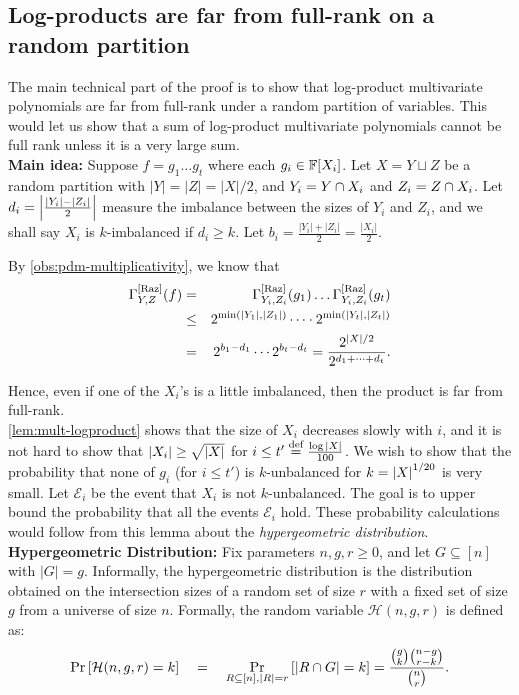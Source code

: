 \subsection{Log-products are far from full-rank on a random
  partition}

The main technical part of the proof is to show that log-product multivariate polynomials are far from full-rank under a random partition of variables. 
This would let us show that a sum of log-product multivariate polynomials cannot be full rank unless it is a very large sum.\\

{\bf Main idea: } Suppose $f = g_1 \dots g_t$ where each $g_i \in \mathbb{F}[X_i]$. 
Let $X = Y \sqcup Z$ be a random partition with $|Y| = |Z| = |X|/2$, and $Y_i = Y \cap X_i$ and $Z_i = Z \cap X_i$. 
Let $d_i = \left|\frac{|Y_i| - |Z_i|}{2}\right|$ measure the imbalance between the sizes of $Y_i$ and $Z_i$, and we shall say $X_i$ is $k$-imbalanced if $d_i \geq k$. 
Let $b_i = \frac{|Y_i| + |Z_i|}{2} = \frac{|X_i|}{2}$.

By \autoref{obs:pdm-multiplicativity}, we know that 
\begin{eqnarray*}
\Gamma^{\mathrm{[Raz]}}_{Y,Z}(f) & = & \Gamma^{\mathrm{[Raz]}}_{Y_i,Z_i}(g_1) \dots \Gamma^{\mathrm{[Raz]}}_{Y_i,Z_i}(g_t)\\
 & \leq & 2^{\min(|Y_1|,|Z_1|)} \cdots  \cdot 2^{\min(|Y_t|,|Z_t|)}\\ 
 & = & 2^{b_1  - d_1} \cdots 2^{b_t - d_t} = \frac{2^{|X|/2}}{2^{d_1 + \dots + d_t}}.
\end{eqnarray*}

Hence, even if one of the $X_i$'s is a little imbalanced, then the product is far from full-rank. \\

\autoref{lem:mult-logproduct} shows that the size of $X_i$ decreases slowly with $i$, and it is not hard to show that $\left|X_i\right| \geq \sqrt{\left|X\right|}$ for $i \leq t'\stackrel{\text{def}}{=}\frac{\log{\left|X\right|}}{100}$. 
We wish to show that the probability that none of $g_i$ (for $i\leq t'$) is $k$-unbalanced for $k = \left|X\right|^{1/20}$ is very small. 
Let $\mathcal{E}_i$ be the event that $X_i$ is not $k$-unbalanced. 
The goal is to upper bound the probability that all the events $\mathcal{E}_i$ hold. 
These probability calculations would follow from this lemma about the \emph{hypergeometric distribution}.\\

{\bf Hypergeometric Distribution: } Fix parameters $n, g, r \geq 0$, and let $G \subseteq [n]$ with $|G| = g$. 
Informally, the hypergeometric distribution is the distribution obtained on the intersection sizes of a random set of size $r$ with a fixed set of size $g$ from a universe of size $n$. 
Formally, the random variable $\mathcal{H}(n,g,r)$ is defined as:
$$
\Pr\left[\mathcal{H}(n,g,r) = k\right] \quad = \quad \Pr_{R\subseteq [n],|R| = r}\left[\left|R \cap G\right| = k\right] = \frac{\binom{g}{k}\binom{n-g}{r-k}}{\binom{n}{r}}.
$$


